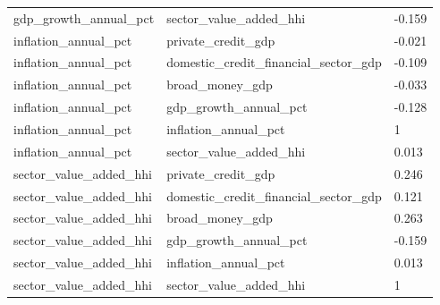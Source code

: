 \begin{tabular}{lll}
gdp\_growth\_annual\_pct & sector\_value\_added\_hhi & -0.159 \\
inflation\_annual\_pct & private\_credit\_gdp & -0.021 \\
inflation\_annual\_pct & domestic\_credit\_financial\_sector\_gdp & -0.109 \\
inflation\_annual\_pct & broad\_money\_gdp & -0.033 \\
inflation\_annual\_pct & gdp\_growth\_annual\_pct & -0.128 \\
inflation\_annual\_pct & inflation\_annual\_pct & 1 \\
inflation\_annual\_pct & sector\_value\_added\_hhi & 0.013 \\
sector\_value\_added\_hhi & private\_credit\_gdp & 0.246 \\
sector\_value\_added\_hhi & domestic\_credit\_financial\_sector\_gdp & 0.121 \\
sector\_value\_added\_hhi & broad\_money\_gdp & 0.263 \\
sector\_value\_added\_hhi & gdp\_growth\_annual\_pct & -0.159 \\
sector\_value\_added\_hhi & inflation\_annual\_pct & 0.013 \\
sector\_value\_added\_hhi & sector\_value\_added\_hhi & 1 \\
\hline
\end{tabular}

